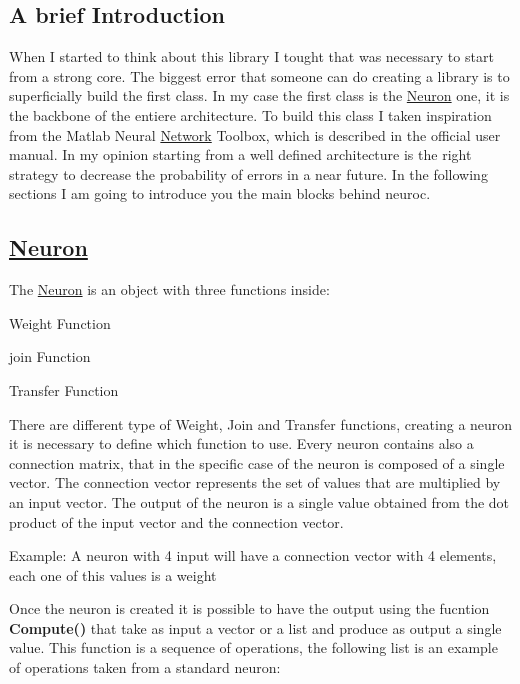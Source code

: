\subsection*{A brief Introduction }

When I started to think about this library I tought that was necessary to start from a strong core. The biggest error that someone can do creating a library is to superficially build the first class. In my case the first class is the \hyperlink{class_neuron}{Neuron} one, it is the backbone of the entiere architecture. To build this class I taken inspiration from the Matlab Neural \hyperlink{class_network}{Network} Toolbox, which is described in the official user manual. In my opinion starting from a well defined architecture is the right strategy to decrease the probability of errors in a near future. In the following sections I am going to introduce you the main blocks behind neuroc.

\subsection*{\hyperlink{class_neuron}{Neuron} }

The \hyperlink{class_neuron}{Neuron} is an object with three functions inside\-:


\begin{DoxyEnumerate}
\item Weight Function
\item join Function
\item Transfer Function
\end{DoxyEnumerate}

There are different type of Weight, Join and Transfer functions, creating a neuron it is necessary to define which function to use. Every neuron contains also a connection matrix, that in the specific case of the neuron is composed of a single vector. The connection vector represents the set of values that are multiplied by an input vector. The output of the neuron is a single value obtained from the dot product of the input vector and the connection vector.

Example\-: A neuron with 4 input will have a connection vector with 4 elements, each one of this values is a weight

Once the neuron is created it is possible to have the output using the fucntion {\bfseries Compute()} that take as input a vector or a list and produce as output a single value. This function is a sequence of operations, the following list is an example of operations taken from a standard neuron\-:


